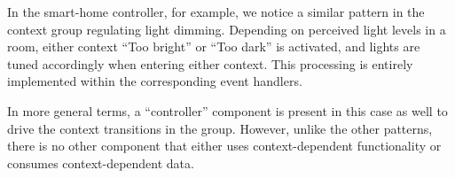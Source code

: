 In the smart-home controller, for example, we notice a similar pattern
in the context group regulating light dimming. Depending on
perceived light levels in a room, either context ``Too bright'' or
``Too dark'' is activated, and lights are tuned accordingly when
entering either context. This processing is entirely implemented
within the corresponding  event handlers. 

In more general terms, a ``controller'' component is present in this
case as well to drive the context transitions in the group. However,
unlike the other patterns, there is no other component that either
uses context-dependent functionality or consumes context-dependent
data.


